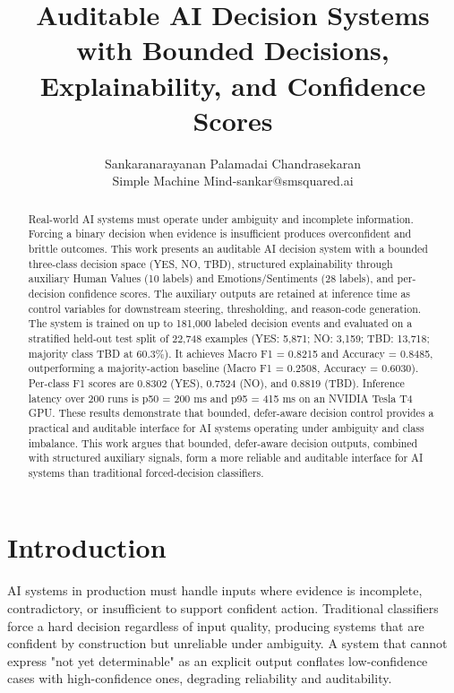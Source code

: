 \documentclass[11pt]{article}
\title{\textbf{Auditable AI Decision Systems with Bounded Decisions, Explainability, and Confidence Scores}}
\author{
Sankaranarayanan Palamadai Chandrasekaran \\
Simple Machine Mind-sankar@smsquared.ai
}
\date{}
\begin{document}
\maketitle

    \begin{abstract}
    Real-world AI systems must operate under ambiguity and incomplete information. Forcing
    a binary decision when evidence is insufficient produces overconfident and brittle outcomes.
    This work presents an auditable AI decision system with a bounded three-class decision space
    (YES, NO, TBD), structured explainability through auxiliary Human Values (10 labels) and Emotions/Sentiments (28 labels), and per-decision confidence scores. 
    The auxiliary outputs are retained at inference time as control variables for downstream steering, thresholding, and
    reason-code generation. The system is trained on up to 181,000 labeled decision events and
    evaluated on a stratified held-out test split of 22,748 examples (YES: 5,871; NO: 3,159; TBD:
    13,718; majority class TBD at 60.3\%). It achieves Macro F1 = 0.8215 and Accuracy = 0.8485,
    outperforming a majority-action baseline (Macro F1 = 0.2508, Accuracy = 0.6030). Per-class
    F1 scores are 0.8302 (YES), 0.7524 (NO), and 0.8819 (TBD). Inference latency over 200 runs is
    p50 = 200 ms and p95 = 415 ms on an NVIDIA Tesla T4 GPU. These results demonstrate that
    bounded, defer-aware decision control provides a practical and auditable interface for AI systems
    operating under ambiguity and class imbalance. This work argues that bounded, defer-aware
    decision outputs, combined with structured auxiliary signals, form a more reliable and auditable
    interface for AI systems than traditional forced-decision classifiers.
    \end{abstract}

\section{Introduction}

AI systems in production must handle inputs where evidence is incomplete,
contradictory, or insufficient to support confident action. Traditional
classifiers force a hard decision regardless of input quality, producing systems
that are confident by construction but unreliable under ambiguity.
A system that cannot express "not yet determinable" as an explicit output conflates low-confidence
cases with high-confidence ones, degrading reliability and auditability.
\end{document}
